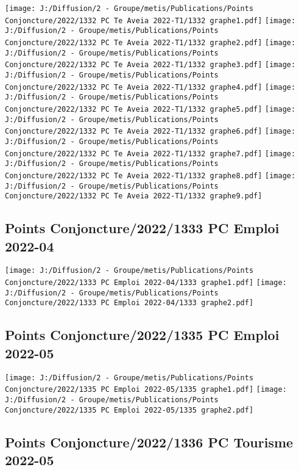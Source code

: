 \documentclass[
]{article}
\begin{document}
\texttt{[image: J:/Diffusion/2 - Groupe/metis/Publications/Points Conjoncture/2022/1332 PC Te Aveia 2022-T1/1332 graphe1.pdf]}
\texttt{[image: J:/Diffusion/2 - Groupe/metis/Publications/Points Conjoncture/2022/1332 PC Te Aveia 2022-T1/1332 graphe2.pdf]}
\texttt{[image: J:/Diffusion/2 - Groupe/metis/Publications/Points Conjoncture/2022/1332 PC Te Aveia 2022-T1/1332 graphe3.pdf]}
\texttt{[image: J:/Diffusion/2 - Groupe/metis/Publications/Points Conjoncture/2022/1332 PC Te Aveia 2022-T1/1332 graphe4.pdf]}
\texttt{[image: J:/Diffusion/2 - Groupe/metis/Publications/Points Conjoncture/2022/1332 PC Te Aveia 2022-T1/1332 graphe5.pdf]}
\texttt{[image: J:/Diffusion/2 - Groupe/metis/Publications/Points Conjoncture/2022/1332 PC Te Aveia 2022-T1/1332 graphe6.pdf]}
\texttt{[image: J:/Diffusion/2 - Groupe/metis/Publications/Points Conjoncture/2022/1332 PC Te Aveia 2022-T1/1332 graphe7.pdf]}
\texttt{[image: J:/Diffusion/2 - Groupe/metis/Publications/Points Conjoncture/2022/1332 PC Te Aveia 2022-T1/1332 graphe8.pdf]}
\texttt{[image: J:/Diffusion/2 - Groupe/metis/Publications/Points Conjoncture/2022/1332 PC Te Aveia 2022-T1/1332 graphe9.pdf]}

\hypertarget{points-conjoncture20221333-pc-emploi-2022-04}{%
\subsection{Points Conjoncture/2022/1333 PC Emploi
2022-04}\label{points-conjoncture20221333-pc-emploi-2022-04}}

\texttt{[image: J:/Diffusion/2 - Groupe/metis/Publications/Points Conjoncture/2022/1333 PC Emploi 2022-04/1333 graphe1.pdf]}
\texttt{[image: J:/Diffusion/2 - Groupe/metis/Publications/Points Conjoncture/2022/1333 PC Emploi 2022-04/1333 graphe2.pdf]}

\hypertarget{points-conjoncture20221335-pc-emploi-2022-05}{%
\subsection{Points Conjoncture/2022/1335 PC Emploi
2022-05}\label{points-conjoncture20221335-pc-emploi-2022-05}}

\texttt{[image: J:/Diffusion/2 - Groupe/metis/Publications/Points Conjoncture/2022/1335 PC Emploi 2022-05/1335 graphe1.pdf]}
\texttt{[image: J:/Diffusion/2 - Groupe/metis/Publications/Points Conjoncture/2022/1335 PC Emploi 2022-05/1335 graphe2.pdf]}

\hypertarget{points-conjoncture20221336-pc-tourisme-2022-05}{%
\subsection{Points Conjoncture/2022/1336 PC Tourisme
2022-05}\label{points-conjoncture20221336-pc-tourisme-2022-05}}
\end{document}
